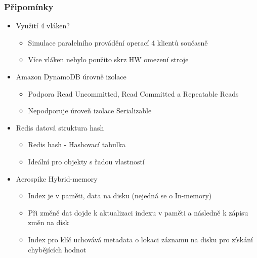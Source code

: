\documentclass{beamer}
\begin{document}
	\begin{frame}[noframenumbering]
		\frametitle{Připomínky}
		\begin{itemize}
			\item Využití 4 vláken?
			\begin{itemize}
				\item Simulace paralelního provádění operací 4 klientů současně
				\item Více vláken nebylo použito skrz HW omezení stroje
			\end{itemize}
			\item Amazon DynamoDB úrovně izolace
			\begin{itemize}
				\item Podpora Read Uncommitted, Read Committed a Repeatable Reads
				\item Nepodporuje úroveň izolace Serializable
			\end{itemize}
			\item Redis datová struktura hash
			\begin{itemize}
				\item Redis hash - Hashovací tabulka
				\item Ideální pro objekty s řadou vlastností
			\end{itemize}
			\item Aerospike Hybrid-memory
			\begin{itemize}
				\item Index je v paměti, data na disku (nejedná se o In-memory)
				\item Při změně dat dojde k aktualizaci indexu v paměti a následně k zápisu změn na disk
				\item Index pro klíč uchovává metadata o lokaci záznamu na disku pro získání chybějících hodnot
			\end{itemize}
		\end{itemize}
	\end{frame}
\end{document}
